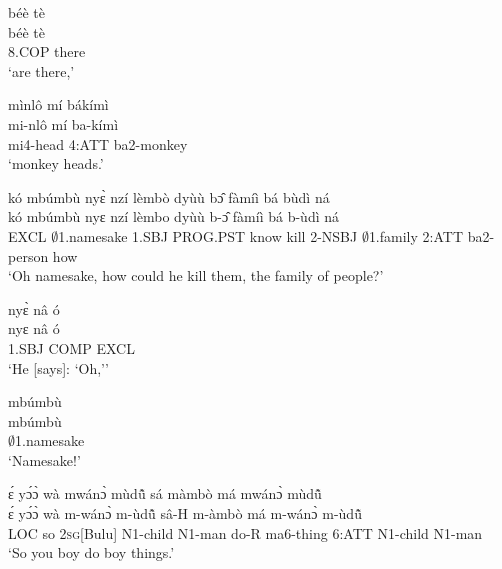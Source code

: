 \begin{exe} 
\exN\label{134}
  \glll béè tè \\
        béè tè \\
        8.COP there\\
    \trans `are there,'
\end{exe}

\begin{exe} 
\exN\label{135}
  \glll mìnlô mí bákímì \\
        mi-nlô mí ba-kímì \\
       mi4-head 4:ATT ba2-monkey  \\
    \trans `monkey heads.'
\end{exe}

\begin{exe} 
\exN\label{136}
  \glll kó mbúmbù nyɛ̀ nzí lèmbò dyùù bɔ̂ fàmíì bá bùdì ná \\
       kó mbúmbù nyɛ nzí lèmbo dyùù b-ɔ̂ fàmíì bá b-ùdì ná \\
       EXCL $\emptyset$1.namesake 1.SBJ PROG.PST know kill 2-NSBJ $\emptyset$1.family 2:ATT ba2-person how \\
    \trans `Oh namesake, how could he kill them, the family of people?'
\end{exe}

\begin{exe} 
\exN\label{137}
  \glll nyɛ̀ nâ ó \\
        nyɛ nâ ó \\
        1.SBJ COMP EXCL \\
    \trans `He [says]: `Oh,''
\end{exe}

\begin{exe} 
\exN\label{138}
  \glll mbúmbù \\
       mbúmbù \\
       $\emptyset$1.namesake  \\
    \trans `Namesake!'
\end{exe}

\begin{exe} 
\exN\label{139}
  \glll ɛ́ yɔ́ɔ̀ wà mwánɔ̀ mùdũ̂ sá màmbò má mwánɔ̀ mùdũ̂ \\
      ɛ́ yɔ́ɔ̀ wà m-wánɔ̀ m-ùdũ̂ sâ-H m-àmbò má m-wánɔ̀ m-ùdũ̂ \\
       LOC so 2\textsc{sg}[Bulu] N1-child N1-man do-R ma6-thing 6:ATT N1-child N1-man  \\
    \trans `So you boy do boy things.'
\end{exe}

